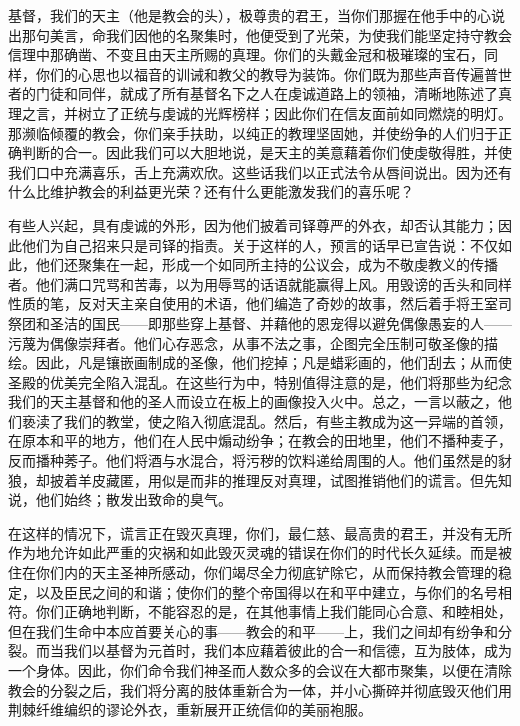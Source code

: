 基督，我们的天主（他是教会的头），极尊贵的君王，当你们那握在他手中的心说出那句美言，命我们因他的名聚集时，他便受到了光荣，为使我们能坚定持守教会信理中那确凿、不变且由天主所赐的真理。你们的头戴金冠和极璀璨的宝石，同样，你们的心思也以福音的训诫和教父的教导为装饰。你们既为那些声音传遍普世者的门徒和同伴，就成了所有基督名下之人在虔诚道路上的领袖，清晰地陈述了真理之言，并树立了正统与虔诚的光辉榜样；因此你们在信友面前如同燃烧的明灯。那濒临倾覆的教会，你们亲手扶助，以纯正的教理坚固她，并使纷争的人们归于正确判断的合一。因此我们可以大胆地说，是天主的美意藉着你们使虔敬得胜，并使我们口中充满喜乐，舌上充满欢欣。这些话我们以正式法令从唇间说出。因为还有什么比维护教会的利益更光荣？还有什么更能激发我们的喜乐呢？\par

有些人兴起，具有虔诚的外形，因为他们披着司铎尊严的外衣，却否认其能力；因此他们为自己招来只是司铎的指责。关于这样的人，预言的话早已宣告说：不仅如此，他们还聚集在一起，形成一个如同所主持的公议会，成为不敬虔教义的传播者。他们满口咒骂和苦毒，以为用辱骂的话语就能赢得上风。用毁谤的舌头和同样性质的笔，反对天主亲自使用的术语，他们编造了奇妙的故事，然后着手将王室司祭团和圣洁的国民——即那些穿上基督、并藉他的恩宠得以避免偶像愚妄的人——污蔑为偶像崇拜者。他们心存恶念，从事不法之事，企图完全压制可敬圣像的描绘。因此，凡是镶嵌画制成的圣像，他们挖掉；凡是蜡彩画的，他们刮去；从而使圣殿的优美完全陷入混乱。在这些行为中，特别值得注意的是，他们将那些为纪念我们的天主基督和他的圣人而设立在板上的画像投入火中。总之，一言以蔽之，他们亵渎了我们的教堂，使之陷入彻底混乱。然后，有些主教成为这一异端的首领，在原本和平的地方，他们在人民中煽动纷争；在教会的田地里，他们不播种麦子，反而播种莠子。他们将酒与水混合，将污秽的饮料递给周围的人。他们虽然是的豺狼，却披着羊皮藏匿，用似是而非的推理反对真理，试图推销他们的谎言。但先知说，他们始终；散发出致命的臭气。\par

在这样的情况下，谎言正在毁灭真理，你们，最仁慈、最高贵的君王，并没有无所作为地允许如此严重的灾祸和如此毁灭灵魂的错误在你们的时代长久延续。而是被住在你们内的天主圣神所感动，你们竭尽全力彻底铲除它，从而保持教会管理的稳定，以及臣民之间的和谐；使你们的整个帝国得以在和平中建立，与你们的名号相符。你们正确地判断，不能容忍的是，在其他事情上我们能同心合意、和睦相处，但在我们生命中本应首要关心的事——教会的和平——上，我们之间却有纷争和分裂。而当我们以基督为元首时，我们本应藉着彼此的合一和信德，互为肢体，成为一个身体。因此，你们命令我们神圣而人数众多的会议在大都市聚集，以便在清除教会的分裂之后，我们将分离的肢体重新合为一体，并小心撕碎并彻底毁灭他们用荆棘纤维编织的谬论外衣，重新展开正统信仰的美丽袍服。\par

